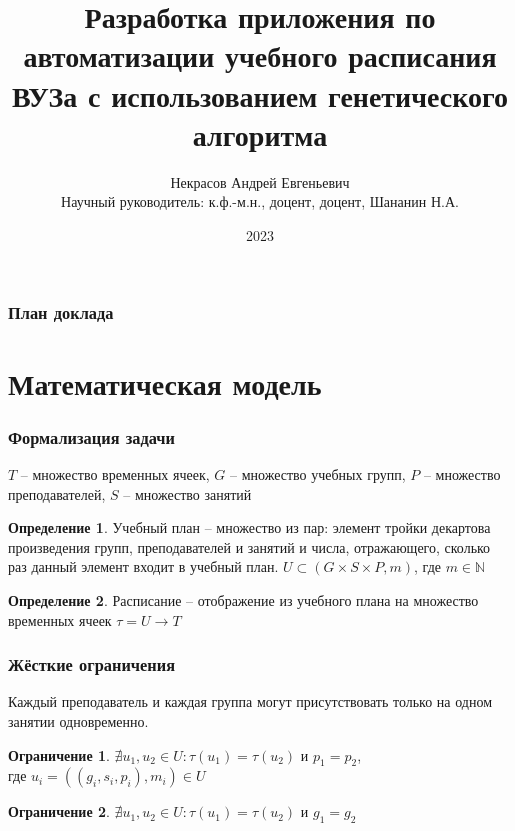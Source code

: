 \documentclass[t, 12pt]{beamer}
\theoremstyle{definition}
\newtheorem{определение}{Определение}
\newtheorem{ограничение}{Ограничение}
\begin{document}
  
    
    \author[Некрасов А.Е.]{Некрасов Андрей Евгеньевич \\ Научный руководитель: к.ф.-м.н., доцент, доцент, Шананин Н.А.}
    \title[ ]{\textbf{Разработка приложения по автоматизации учебного расписания ВУЗа с использованием генетического алгоритма}}
    \date[ ]{2023}

\begin{frame}[plain]
    \maketitle
\end{frame}

\begin{frame}[c]
\frametitle{План доклада}
\tableofcontents
\end{frame}

\section{Математическая модель}
\begin{frame}
\frametitle{Формализация задачи}
$T$ – множество временных ячеек, $G$ – множество учебных групп, $P$ – множество преподавателей, $S$ – множество занятий
\begin{определение}
Учебный план – множество из пар: элемент тройки декартова произведения групп, преподавателей и занятий и числа, отражающего, сколько раз данный элемент входит в учебный план.
$U \subset (G \times S \times P, m)$, где $m \in \mathbb{N}$
\end{определение}
\begin{определение}
Расписание – отображение из учебного плана на множество временных ячеек
$\tau = U \to T$
\end{определение}
\end{frame}

\begin{frame}
\frametitle{Жёсткие ограничения}
Каждый преподаватель и каждая группа могут присутствовать только на одном занятии одновременно.\\
\begin{ограничение}
$\nexists u_1, u_2 \in U: \tau(u_1)=\tau(u_2)$ и $p_1=p_2$,\\
где $u_i = ((g_i, s_i, p_i), m_i) \in U$
\end{ограничение}
\begin{ограничение}
$\nexists u_1, u_2 \in U: \tau(u_1)=\tau(u_2)$ и $g_1=g_2$
\end{ограничение}
\end{frame}
\end{document}

